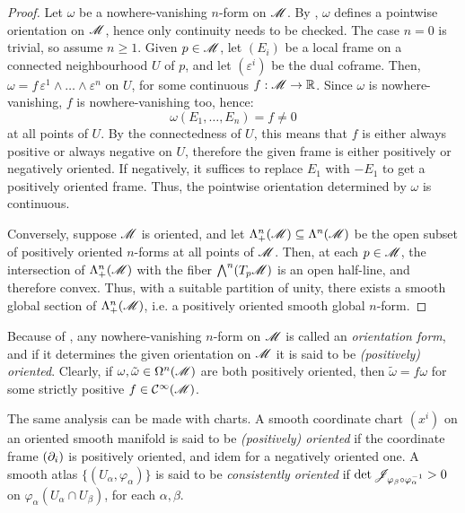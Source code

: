 \begin{proofbox}
  \begin{proof}
    Let $ \omega $ be a nowhere-vanishing $ n $-form on $ \mathscr{M} $. By , $ \omega $ defines a pointwise orientation on $ \mathscr{M} $, hence only continuity needs to be checked. The case $ n = 0 $ is trivial, so assume $ n \geq 1 $. Given $ p \in \mathscr{M} $, let $ (E_i) $ be a local frame on a connected neighbourhood $ U $ of $ p $, and let $ (\varepsilon^i) $ be the dual coframe. Then, $ \omega = f \, \varepsilon^1 \wedge \dots \wedge \varepsilon^n $ on $ U $, for some continuous $ f : \mathscr{M} \rightarrow \mathbb{R} $. Since $ \omega $ is nowhere-vanishing, $ f $ is nowhere-vanishing too, hence:
    \begin{equation*}
      \omega(E_1 , \dots , E_n) = f \neq 0
    \end{equation*}
    at all points of $ U $. By the connectedness of $ U $, this means that $ f $ is either always positive or always negative on $ U $, therefore the given frame is either positively or negatively oriented. If negatively, it suffices to replace $ E_1 $ with $ -E_1 $ to get a positively oriented frame. Thus, the pointwise orientation determined by $ \omega $ is continuous.

    Conversely, suppose $ \mathscr{M} $ is oriented, and let $ \Lambda_+^n(\mathscr{M}) \subseteq \Lambda^{n}(\mathscr{M}) $ be the open subset of positively oriented $ n $-forms at all points of $ \mathscr{M} $. Then, at each $ p \in \mathscr{M} $, the intersection of $ \Lambda_+^n(\mathscr{M}) $ with the fiber $ {\bigwedge}^{n}(T_p\mathscr{M}) $ is an open half-line, and therefore convex. Thus, with a suitable partition of unity, there exists a smooth global section of $ \Lambda_+^n(\mathscr{M}) $, i.e. a positively oriented smooth global $ n $-form.
  \end{proof}
\end{proofbox}

Because of , any nowhere-vanishing $ n $-form on $ \mathscr{M} $ is called an \emph{orientation form}, and if it determines the given orientation on $ \mathscr{M} $ it is said to be \emph{(positively) oriented}. Clearly, if $ \omega , \tilde{\omega} \in \Omega^{n}(\mathscr{M}) $ are both positively oriented, then $ \tilde{\omega} = f \omega $ for some strictly positive $ f \in \mathcal{C}^{\infty}(\mathscr{M}) $.

The same analysis can be made with charts. A smooth coordinate chart $ (x^i) $ on an oriented smooth manifold is said to be \emph{(positively) oriented} if the coordinate frame $ (\partial_i) $ is positively oriented, and idem for a negatively oriented one. A smooth atlas $ \{(U_\alpha,\varphi_\alpha)\} $ is said to be \emph{consistently oriented} if $ \det \mathscr{J}_{\varphi_\beta \circ \varphi_\alpha^{-1}} > 0 $ on $ \varphi_\alpha(U_\alpha \cap U_\beta) $, for each $ \alpha , \beta $.

